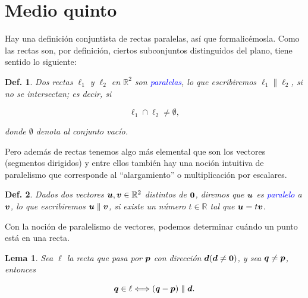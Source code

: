 \documentclass{article}
\theoremstyle{definicion}
\newtheorem{definicion}{Def.}
\theoremstyle{definition}             %
\theoremstyle{definition}             %
\theoremstyle{definition}
\theoremstyle{definition}
\theoremstyle{observacion}
\theoremstyle{definition}
\theoremstyle{plain}
\newtheorem{lemma}{Lema}
\theoremstyle{definition}
\theoremstyle{afirmacion}
\theoremstyle{notation}
\theoremstyle{definition}
\begin{document}
        \section{Medio quinto}

        Hay una definición conjuntista de rectas paralelas, así que formalicémosla. Como las rectas son, por definición, ciertos subconjuntos distinguidos del plano, tiene sentido lo siguiente:

        \begin{definicion}
            Dos rectas \(\ell_{1}\) y \(\ell_{2}\) en \(\mathbb{R}^{2}\) son \textcolor{blue}{paralelas}, lo que escribiremos \(\ell_{1} \parallel \ell_{2}\), si no se intersectan; es decir, si

            \begin{equation*}
                \ell_{1} \cap \ell_{2} \neq \emptyset,
            \end{equation*}

            donde \(\emptyset\) denota al conjunto vacío.
        \end{definicion}


        Pero además de rectas tenemos algo más elemental que son los vectores (segmentos dirigidos) y entre ellos también hay una noción intuitiva de paralelismo que corresponde al ``alargamiento'' o multiplicación por escalares.

        \begin{definicion}
            Dados dos vectores \(\vb*{u}, \vb*{v} \in \mathbb{R}^{2}\) distintos de \(\vb*{0}\), diremos que \(\vb*{u}\) es \textcolor{blue}{paralelo} a \(\vb*{v}\), lo que escribiremos \(\vb*{u} \parallel \vb*{v}\), si existe un número \(t \in \mathbb{R}\) tal que \(\vb*{u} = t \vb*{v}\).
        \end{definicion}

        Con la noción de paralelismo de vectores, podemos determinar cuándo un punto está en una recta.

        \begin{lemma}
            Sea \(\ell\) la recta que pasa por \(\vb*{p}\) con dirección \(\vb*{d} (\vb*{d} \neq \vb*{0})\), y sea \(\vb*{q} \neq \vb*{p}\), entonces

            \begin{equation*}
                \vb*{q} \in \ell \Longleftrightarrow (\vb*{q} - \vb*{p}) \parallel \vb*{d}.
            \end{equation*}
        \end{lemma}
\end{document}
